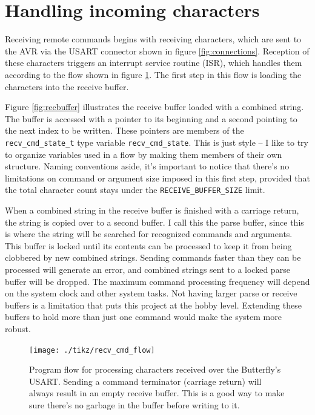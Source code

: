 \clearpage
\section{Handling incoming characters}
Receiving remote commands begins with receiving characters, which are sent to the AVR via the USART connector shown in figure \ref{fig:connections}.  Reception of these characters triggers an interrupt service routine (ISR), which handles them according to the flow shown in figure \ref{fig:recflow}. The first step in this flow is loading the characters into the receive buffer.

Figure \ref{fig:recbuffer} illustrates the receive buffer loaded with a combined string.  The buffer is accessed with a pointer to its beginning and a second pointing to the next index to be written.  These pointers are members of the \texttt{recv\_cmd\_state\_t} type variable \texttt{recv\_cmd\_state}.  This is just style -- I like to try to organize variables used in a flow by making them members of their own structure.  Naming conventions aside, it's important to notice that there's no limitations on command or argument size imposed in this first step, provided that the total character count stays under the \texttt{RECEIVE\_BUFFER\_SIZE} limit. 
 
When a combined string in the receive buffer is finished with a carriage return, the string is copied over to a second buffer.  I call this the parse buffer, since this is where the string will be searched for recognized commands and arguments.  This buffer is locked until its contents can be processed to keep it from being clobbered by new combined strings.  Sending commands faster than they can be processed will generate an error, and combined strings sent to a locked parse buffer will be dropped.  The maximum command processing frequency will depend on the system clock and other system tasks.  Not having larger parse or receive buffers is a limitation that puts this project at the hobby level.  Extending these buffers to hold more than just one command would make the system more robust.

\begin{figure}[ht]
    \begin{center}
        \texttt{[image: ./tikz/recv\_cmd\_flow]}
        \caption{Program flow for processing characters received over the Butterfly's USART.  Sending a command terminator (carriage return) will always result in an empty receive buffer.  This is a good way to make sure there's no garbage in the buffer before writing to it.\label{fig:recflow}}
    \end{center}
\end{figure}

